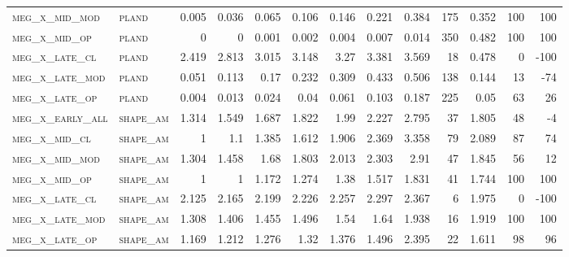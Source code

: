 \begin{landscape}
\begin{center}
\begin{footnotesize}
\begin{longtable}{llrrrrrrrr|rrr}
\textsc{meg\_x\_mid\_mod  } & \textsc{pland     }   & 0.005    & 0.036    & 0.065    & 0.106    & 0.146    & 0.221    & 0.384     & 175    & 0.352         & 100           & 100             \\
\textsc{meg\_x\_mid\_op   } & \textsc{pland     }   & 0        & 0        & 0.001    & 0.002    & 0.004    & 0.007    & 0.014     & 350    & 0.482         & 100           & 100             \\
\textsc{meg\_x\_late\_cl  } & \textsc{pland     }   & 2.419    & 2.813    & 3.015    & 3.148    & 3.27     & 3.381    & 3.569     & 18     & 0.478         & 0             & -100            \\
\textsc{meg\_x\_late\_mod } & \textsc{pland     }   & 0.051    & 0.113    & 0.17     & 0.232    & 0.309    & 0.433    & 0.506     & 138    & 0.144         & 13            & -74             \\
\textsc{meg\_x\_late\_op  } & \textsc{pland     }   & 0.004    & 0.013    & 0.024    & 0.04     & 0.061    & 0.103    & 0.187     & 225    & 0.05          & 63            & 26              \\
\textsc{meg\_x\_early\_all} & \textsc{shape\_am }   & 1.314    & 1.549    & 1.687    & 1.822    & 1.99     & 2.227    & 2.795     & 37     & 1.805         & 48            & -4              \\
\textsc{meg\_x\_mid\_cl   } & \textsc{shape\_am }   & 1        & 1.1      & 1.385    & 1.612    & 1.906    & 2.369    & 3.358     & 79     & 2.089         & 87            & 74              \\
\textsc{meg\_x\_mid\_mod  } & \textsc{shape\_am }   & 1.304    & 1.458    & 1.68     & 1.803    & 2.013    & 2.303    & 2.91      & 47     & 1.845         & 56            & 12              \\
\textsc{meg\_x\_mid\_op   } & \textsc{shape\_am }   & 1        & 1        & 1.172    & 1.274    & 1.38     & 1.517    & 1.831     & 41     & 1.744         & 100           & 100             \\
\textsc{meg\_x\_late\_cl  } & \textsc{shape\_am }   & 2.125    & 2.165    & 2.199    & 2.226    & 2.257    & 2.297    & 2.367     & 6      & 1.975         & 0             & -100            \\
\textsc{meg\_x\_late\_mod } & \textsc{shape\_am }   & 1.308    & 1.406    & 1.455    & 1.496    & 1.54     & 1.64     & 1.938     & 16     & 1.919         & 100           & 100             \\
\textsc{meg\_x\_late\_op  } & \textsc{shape\_am }   & 1.169    & 1.212    & 1.276    & 1.32     & 1.376    & 1.496    & 2.395     & 22     & 1.611         & 98            & 96              \\

\end{longtable}
\end{footnotesize}
\end{center}
\end{landscape}
